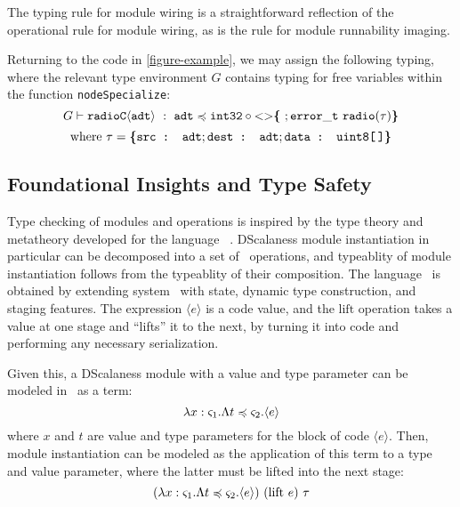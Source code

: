 The  typing rule for module wiring is a straightforward reflection of the
operational rule for module wiring, as is the  rule for module runnability
imaging.
\begin{example}
\label{example-scalanesstyping}
Returning to the code in \autoref{figure-example}, we may assign the following typing, where the
relevant type environment $G$ contains typing for free variables within the function
\texttt{nodeSpecialize}:
$$
  G \vdash \mathtt{radioC\langle adt \rangle}\ :\  
    \texttt{adt} \preccurlyeq \texttt{int32} \circ \mathrm{<}\mathrm{>}\textup{\textbf{\{}}\ ;
      \mathtt{error\_t\ radio(\tau)} \textup{\textbf{\}}}
$$
$$
\text{where}\ \tau = \textup{\textbf{\{}} \texttt{src : adt}; \texttt{dest : adt}; \texttt{data : uint8[\,]} \textup{\textbf{\}}} 
$$
\end{example}

\subsection{Foundational Insights and Type Safety} 
\label{section-framedml}

Type checking of modules and operations is inspired by the type theory and metatheory developed
for the language \fml\ \cite{FramedML}. DScalaness module instantiation in particular can be
decomposed into a set of \fml\ operations, and typeablity of module instantiation follows from
the typeablity of their composition. The language \fml\ is obtained by extending system \fsub\
with state, dynamic type construction, and staging features. The expression $\langle e \rangle$
is a code value, and the $\mathrm{lift}$ operation takes a value at one stage and ``lifts'' it
to the next, by turning it into code and performing any necessary serialization.

Given this, a DScalaness module with a value and type parameter can be
modeled in \fml\ as a term: 
$$\lambda x : \varsigma_1 . \Lambda t \preccurlyeq \varsigma_2 . \langle e \rangle$$
where $x$ and $t$ are value and type parameters for the block of code $\langle e \rangle$. Then,
module instantiation can be modeled as the application of this term to a type and value
parameter, where the latter must be lifted into the next stage:
$$
(\lambda x : \s_1 . \Lambda t \subtype \s_2 . \langle e \rangle)\ (\mathrm{lift}\ e)\ \t
$$ 


